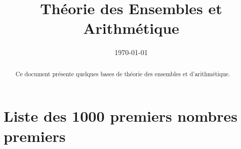 
 
\title{Théorie des Ensembles et Arithmétique}
\date{\today}
\author{%
\Fstar} 

 
\date{}
\maketitle 
\begin{abstract}
Ce document présente quelques bases de théorie des ensembles et d'arithmétique.
\end{abstract}
\bigskip
\begin{multicols}{2}
\renewcommand{\contentsname}{Table des matières}
\tableofcontents 
\end{multicols}

\clearpage



\clearpage



\clearpage

\appendix



\clearpage

\section{Liste des 1000 premiers nombres premiers} 

\noindent\textsf{}

\bye
